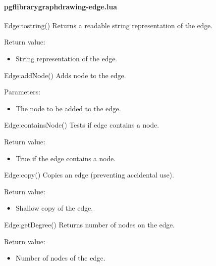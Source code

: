
\paragraph{pgflibrarygraphdrawing-edge.lua}


\begin{luacommand}{{Edge:\textunderscore{}\textunderscore{}tostring}()}
Returns a readable string representation of the edge.


Return value:
\begin{itemize} \item[] String representation of the edge. \end{itemize}


\end{luacommand}\begin{luacommand}{{Edge:addNode}()}
Adds node to the edge.

Parameters:
\begin{itemize}
	\item[]  \subitem The node to be added to the edge.
\end{itemize}



\end{luacommand}\begin{luacommand}{{Edge:containsNode}()}
Tests if edge contains a node.


Return value:
\begin{itemize} \item[] True if the edge contains a node. \end{itemize}


\end{luacommand}\begin{luacommand}{{Edge:copy}()}
Copies an edge (preventing accidental use).


Return value:
\begin{itemize} \item[] Shallow copy of the edge. \end{itemize}


\end{luacommand}\begin{luacommand}{{Edge:getDegree}()}
Returns number of nodes on the edge.


Return value:
\begin{itemize} \item[] Number of nodes of the edge. \end{itemize}



\end{luacommand}
